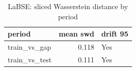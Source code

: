 \begin{table}[ht]
\centering
\caption{LaBSE: sliced Wasserstein distance by period}
\label{tab:labse_period_swd}
\begin{tabular}{lrl}
\toprule
period & mean swd & drift 95 \\
\midrule
train\_vs\_gap & 0.118 & Yes \\
train\_vs\_test & 0.111 & Yes \\
\bottomrule
\end{tabular}
\end{table}
